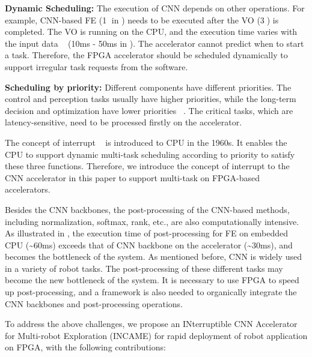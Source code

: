 
\textbf{Dynamic Scheduling:} The execution of CNN depends on other operations. For example, CNN-based FE (\textcircled{1} in ) needs to be executed after the VO (\textcircled{3}) is completed. 
The VO is running on the CPU, and the execution time varies with the input data  ~\cite{mohanan2018survey} (10ms - 50ms in ). 
The accelerator cannot predict when to start a task. 
Therefore, the FPGA accelerator should be scheduled dynamically to support irregular task requests from the software.

\textbf{Scheduling by priority:} Different components have different priorities. The control and perception tasks usually have higher priorities, while the long-term decision and optimization have lower priorities  ~\cite{RamsauerKLM17}. The critical tasks, which are latency-sensitive,  need to be processed firstly on the accelerator.

The concept of interrupt  ~\cite{jen1974processor} is introduced to CPU in the 1960s. It enables the CPU to support dynamic multi-task scheduling according to priority to satisfy these three functions. Therefore, we introduce the concept of interrupt to the CNN accelerator in this paper to support multi-task on FPGA-based accelerators.

Besides the CNN backbones, the post-processing of the CNN-based methods, including normalization, softmax, rank, etc., are also computationally intensive. As illustrated in , the execution time of post-processing for FE on embedded CPU (\textasciitilde 60ms) exceeds that of CNN backbone on the accelerator (\textasciitilde  30ms), and becomes the bottleneck of the system. 
As mentioned before, CNN is widely used in a variety of robot tasks.
The post-processing of these different tasks may become the new bottleneck of the system.
It is necessary to use FPGA to speed up post-processing, and a framework is also needed to organically integrate the CNN backbones and post-processing operations.

To address the above challenges, we propose an INterruptible CNN Accelerator for Multi-robot Exploration (INCAME) for rapid deployment of robot application on FPGA, with the following contributions:

